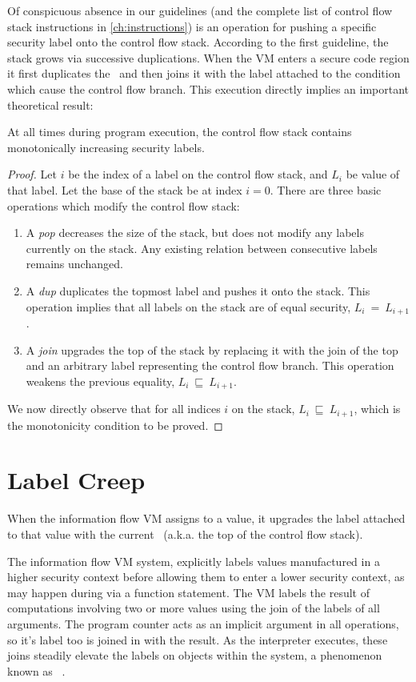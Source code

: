 Of conspicuous absence in our guidelines (and the complete list of control flow stack instructions in \autoref{ch:instructions}) is an operation for pushing a specific security label onto the control flow stack.
According to the first guideline, the stack grows via successive duplications.
When the VM enters a secure code region it first duplicates the \pclabel\ and then joins it with the label attached to the condition which cause the control flow branch.
This execution directly implies an important theoretical result:
\begin{theorem}
  At all times during program execution, the control flow stack contains monotonically increasing security labels.
\end{theorem}
\begin{proof}
 Let $i$ be the index of a label on the control flow stack, and $L_i$ be value of that label.
 Let the base of the stack be at index $i=0$.
 There are three basic operations which modify the control flow stack:
 \begin{enumerate}
  \item A \textit{pop} decreases the size of the stack, but does not modify any labels currently on the stack. Any existing relation between consecutive labels remains unchanged.
  \item A \textit{dup} duplicates the topmost label and pushes it onto the stack. This operation implies that all labels on the stack are of equal security, $L_i~=~L_{i+1}$.
  \item A \textit{join} upgrades the top of the stack by replacing it with the join of the top and an arbitrary label representing the control flow branch. This operation weakens the previous equality, $L_i~\sqsubseteq~L_{i+1}$.
 \end{enumerate}
 We now directly observe that for all indices $i$ on the stack, $L_i~\sqsubseteq~L_{i+1}$, which is the monotonicity condition to be proved.
\end{proof}

\section{Label Creep}
When the information flow VM assigns to a value, it upgrades the label attached to that value with the current \pclabel\ (a.k.a. the top of the control flow stack).

The information flow VM system, explicitly labels values manufactured in a higher security context before allowing them to enter a lower security context, as may happen during via a function  statement.
The VM labels the result of computations involving two or more values using the join of the labels of all arguments.
The program counter acts as an implicit argument in all operations, so it's label too is joined in with the result.
As the interpreter executes, these joins steadily elevate the labels on objects within the system, a phenomenon known as ~\cite{sabelfeld.myers+03}.

